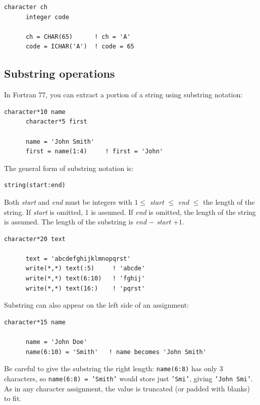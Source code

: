 \begin{lstlisting}[style=fortran77]
      character ch
      integer code
      
      ch = CHAR(65)      ! ch = 'A'
      code = ICHAR('A')  ! code = 65
\end{lstlisting}

\subsection{Substring operations}

In Fortran 77, you can extract a portion of a string using substring notation:

\begin{lstlisting}[style=fortran77]
      character*10 name
      character*5 first
      
      name = 'John Smith'
      first = name(1:4)     ! first = 'John'
\end{lstlisting}

The general form of substring notation is:

\begin{lstlisting}[style=fortran77]
      string(start:end)
\end{lstlisting}

Both \emph{start} and \emph{end} must be integers with $1 \leq$ \emph{start} $\leq$ \emph{end} $\leq$ the length of the string. If \emph{start} is omitted, 1 is assumed. If \emph{end} is omitted, the length of the string is assumed. The length of the substring is \emph{end} $-$ \emph{start} $+ 1$.

\begin{lstlisting}[style=fortran77]
      character*20 text
      
      text = 'abcdefghijklmnopqrst'
      write(*,*) text(:5)     ! 'abcde'
      write(*,*) text(6:10)   ! 'fghij'
      write(*,*) text(16:)    ! 'pqrst'
\end{lstlisting}

Substring can also appear on the left side of an assignment:

\begin{lstlisting}[style=fortran77]
      character*15 name
      
      name = 'John Doe'
      name(6:10) = 'Smith'   ! name becomes 'John Smith'
\end{lstlisting}

Be careful to give the substring the right length: \texttt{name(6:8)} has only 3 characters, so \texttt{name(6:8) = 'Smith'} would store just \texttt{'Smi'}, giving \texttt{'John Smi'}. As in any character assignment, the value is truncated (or padded with blanks) to fit.

